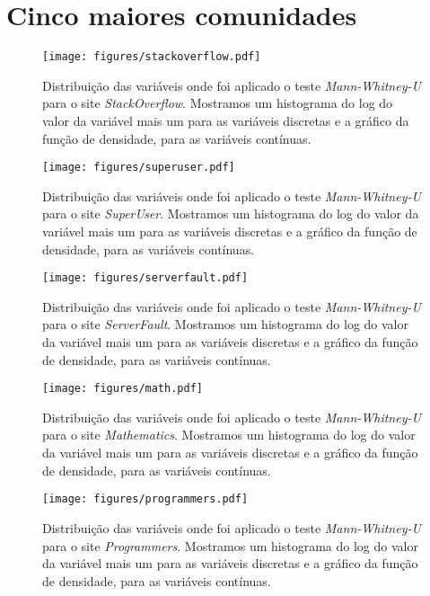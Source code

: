\chapter{Cinco maiores comunidades}
\label{app:distrib}

\begin{figure}
  \centering
  \texttt{[image: figures/stackoverflow.pdf]}
  \caption[Distribuição das variáveis para o site \emph{StackOverflow}]{Distribuição das variáveis onde foi aplicado o teste \emph{Mann-Whitney-U} para o site \emph{StackOverflow}. Mostramos um histograma do log do valor da variável mais um para as variáveis discretas e a gráfico da função de densidade, para as variáveis contínuas. }
\end{figure}

\begin{figure}
	\centering
  \texttt{[image: figures/superuser.pdf]}
 \caption[Distribuição das variáveis para o site \emph{SuperUser}]{Distribuição das variáveis onde foi aplicado o teste \emph{Mann-Whitney-U} para o site \emph{SuperUser}. Mostramos um histograma do log do valor da variável mais um para as variáveis discretas e a gráfico da função de densidade, para as variáveis contínuas. }
\end{figure}

\begin{figure}
	\centering
  \texttt{[image: figures/serverfault.pdf]}
  \caption[Distribuição das variáveis para o site \emph{ServerFault}]{Distribuição das variáveis onde foi aplicado o teste \emph{Mann-Whitney-U} para o site \emph{ServerFault}. Mostramos um histograma do log do valor da variável mais um para as variáveis discretas e a gráfico da função de densidade, para as variáveis contínuas. }
\end{figure}

\begin{figure}
	\centering
  \texttt{[image: figures/math.pdf]}
  \caption[Distribuição das variáveis para o site \emph{Mathematics}]{Distribuição das variáveis onde foi aplicado o teste \emph{Mann-Whitney-U} para o site \emph{Mathematics}. Mostramos um histograma do log do valor da variável mais um para as variáveis discretas e a gráfico da função de densidade, para as variáveis contínuas. }
\end{figure}

\begin{figure}
  \centering
  \texttt{[image: figures/programmers.pdf]}
  \caption[Distribuição das variáveis para o site \emph{Programmers}]{Distribuição das variáveis onde foi aplicado o teste \emph{Mann-Whitney-U} para o site \emph{Programmers}. Mostramos um histograma do log do valor da variável mais um para as variáveis discretas e a gráfico da função de densidade, para as variáveis contínuas. }
\end{figure}
